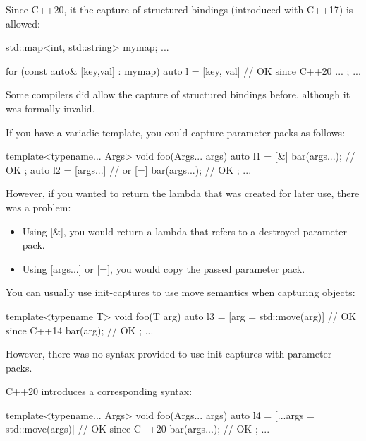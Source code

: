 
Since C++20, it the capture of structured bindings (introduced with C++17) is allowed:

\begin{cpp}
std::map<int, std::string> mymap;
...

for (const auto& [key,val] : mymap) {
	auto l = [key, val] { // OK since C++20
				...
			};
	...
}
\end{cpp}

Some compilers did allow the capture of structured bindings before, although it was formally invalid.





If you have a variadic template, you could capture parameter packs as follows:

\begin{cpp}
template<typename... Args>
void foo(Args... args)
{
	auto l1 = [&] {
					bar(args...); // OK
				};
	auto l2 = [args...] { // or [=]
					bar(args...); // OK
				};
	...
}
\end{cpp}

However, if you wanted to return the lambda that was created for later use, there was a problem:

\begin{itemize}
\item 
Using [\&], you would return a lambda that refers to a destroyed parameter pack.

\item 
Using [args...] or [=], you would copy the passed parameter pack.
\end{itemize}

You can usually use init-captures to use move semantics when capturing objects:

\begin{cpp}
template<typename T>
void foo(T arg)
{
	auto l3 = [arg = std::move(arg)] { // OK since C++14
				bar(arg); // OK
			};
	...
}
\end{cpp}

However, there was no syntax provided to use init-captures with parameter packs.

C++20 introduces a corresponding syntax:

\begin{cpp}
template<typename... Args>
void foo(Args... args)
{
	auto l4 = [...args = std::move(args)] { // OK since C++20
				bar(args...); // OK
			};
	...
}
\end{cpp}

